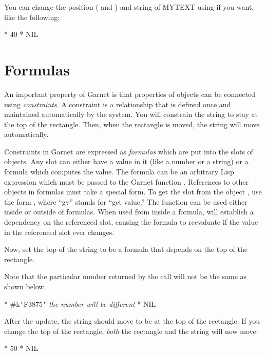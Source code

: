 You can change the position ( and ) and string of
MYTEXT using  if you want, like the following:
\begin{programexample}
* 
40
* 
NIL
\end{programexample}


\section{Formulas}
An important property of Garnet is that properties of objects can be
connected using {\it constraints}.  A constraint is a relationship that is
defined once and maintained automatically by the system.  You
will constrain the string to stay at the top of the rectangle.  Then, when
the rectangle is moved, the string will move automatically.

Constraints in Garnet are expressed as {\it formulas} which are put into the
slots of objects.  Any slot can either have a value in it (like a number or
a string) or a formula which computes the value.  The formula can be an
arbitrary Lisp expression which must be passed to the Garnet function
.  References to other objects in formulas must take a special
form.  To get the slot  from the object
, use the form , where
``gv'' stands for ``get value.''  The  function can be used either
inside or outside of formulas.  When used from inside a formula,  will
establish a dependency on the referenced slot, causing the formula to
reevaluate if the value in the referenced slot ever changes.

Now, set the top of the string to be a formula that depends on the
top of the rectangle.

Note that the particular number returned by the  call will not
be the same as shown below.
\begin{programexample}
* 
\#k{\tt\char`\<}F3875{\tt\char`\>}   {\it the number will be different}
* 
NIL
\end{programexample}

After the update, the string should move to be at the top of the rectangle.
If you change the top of the rectangle, {\it both} the rectangle and the string
will now move:
\begin{programexample}
* 
50
* 
NIL
\end{programexample}

